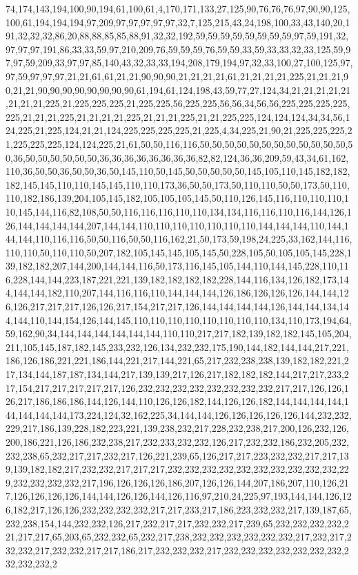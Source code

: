 74,174,143,194,100,90,194,61,100,61,4,170,171,133,27,125,90,76,76,76,97,90,90,125,100,61,194,194,194,97,209,97,97,97,97,97,32,7,125,215,43,24,198,100,33,43,140,20,191,32,32,32,86,20,88,88,85,85,88,91,32,32,192,59,59,59,59,59,59,59,59,97,59,191,32,97,97,97,191,86,33,33,59,97,210,209,76,59,59,59,76,59,59,33,59,33,33,32,33,125,59,97,97,59,209,33,97,97,85,140,43,32,33,33,194,208,179,194,97,32,33,100,27,100,125,97,97,59,97,97,97,21,21,61,61,21,21,90,90,90,21,21,21,21,61,21,21,21,21,225,21,21,21,90,21,21,90,90,90,90,90,90,90,90,61,194,61,124,198,43,59,77,27,124,34,21,21,21,21,21,21,21,21,225,21,225,225,225,21,225,225,56,225,225,56,56,34,56,56,225,225,225,225,225,21,21,21,225,21,21,21,21,225,21,21,21,225,21,21,225,225,124,124,124,34,34,56,124,225,21,225,124,21,21,124,225,225,225,225,21,225,4,34,225,21,90,21,225,225,225,21,225,225,225,124,124,225,21,61,50,50,116,116,50,50,50,50,50,50,50,50,50,50,50,50,50,36,50,50,50,50,50,50,36,36,36,36,36,36,36,36,82,82,124,36,36,209,59,43,34,61,162,110,36,50,50,36,50,50,36,50,145,110,50,145,50,50,50,50,50,145,105,110,145,182,182,182,145,145,110,110,145,145,110,110,173,36,50,50,173,50,110,110,50,50,173,50,110,110,182,186,139,204,105,145,182,105,105,105,145,50,110,126,145,116,110,110,110,110,145,144,116,82,108,50,50,116,116,116,110,110,134,134,116,116,110,116,144,126,126,144,144,144,144,207,144,144,110,110,110,110,110,110,110,144,144,144,110,144,144,144,110,116,116,50,50,116,50,50,116,162,21,50,173,59,198,24,225,33,162,144,116,110,110,50,110,110,50,207,182,105,145,145,105,145,50,228,105,50,105,105,145,228,139,182,182,207,144,200,144,144,116,50,173,116,145,105,144,110,144,145,228,110,116,228,144,144,223,187,221,221,139,182,182,182,182,228,144,116,134,126,182,173,144,144,144,182,110,207,144,116,116,110,144,144,144,126,186,126,126,126,144,144,126,126,217,217,217,126,126,217,154,217,217,126,144,144,144,144,126,144,144,134,144,144,110,144,154,126,144,145,110,110,110,110,110,110,110,110,134,110,173,194,64,59,162,90,34,144,144,144,144,144,144,110,110,217,217,182,139,182,182,145,105,204,211,105,145,187,182,145,233,232,126,134,232,232,175,190,144,182,144,144,217,221,186,126,186,221,221,186,144,221,217,144,221,65,217,232,238,238,139,182,182,221,217,134,144,187,187,134,144,217,139,139,217,126,217,182,182,182,144,217,217,233,217,154,217,217,217,217,217,126,232,232,232,232,232,232,232,232,217,217,126,126,126,217,186,186,186,144,126,144,110,126,126,182,144,126,126,182,144,144,144,144,144,144,144,144,173,224,124,32,162,225,34,144,144,126,126,126,126,126,144,232,232,229,217,186,139,228,182,223,221,139,238,232,217,228,232,238,217,200,126,232,126,200,186,221,126,186,232,238,217,232,233,232,232,126,217,232,232,186,232,205,232,232,238,65,232,217,217,232,217,126,221,239,65,126,217,217,223,232,232,217,217,139,139,182,182,217,232,232,217,217,217,232,232,232,232,232,232,232,232,232,232,229,232,232,232,232,217,196,126,126,126,186,207,126,126,144,207,186,207,110,126,217,126,126,126,126,144,144,126,126,144,126,116,97,210,24,225,97,193,144,144,126,126,182,217,126,126,232,232,232,232,217,217,233,217,186,223,232,232,217,139,187,65,232,238,154,144,232,232,126,217,232,217,217,232,232,217,239,65,232,232,232,232,221,217,217,65,203,65,232,232,65,232,217,238,232,232,232,232,232,232,217,232,217,232,232,217,232,232,217,217,186,217,232,232,232,217,232,232,232,232,232,232,232,232,232,232,2